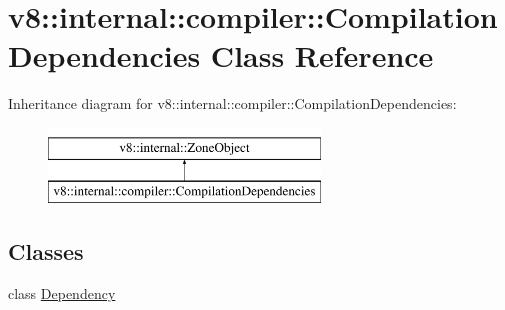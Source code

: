 \hypertarget{classv8_1_1internal_1_1compiler_1_1CompilationDependencies}{}\section{v8\+:\+:internal\+:\+:compiler\+:\+:Compilation\+Dependencies Class Reference}
\label{classv8_1_1internal_1_1compiler_1_1CompilationDependencies}
Inheritance diagram for v8\+:\+:internal\+:\+:compiler\+:\+:Compilation\+Dependencies\+:\begin{figure}[H]
\begin{center}
\leavevmode
\includegraphics[height=2.000000cm]{classv8_1_1internal_1_1compiler_1_1CompilationDependencies}
\end{center}
\end{figure}
\subsection*{Classes}
\begin{DoxyCompactItemize}
\item 
class \mbox{\hyperlink{classv8_1_1internal_1_1compiler_1_1CompilationDependencies_1_1Dependency}{Dependency}}
\end{DoxyCompactItemize}
